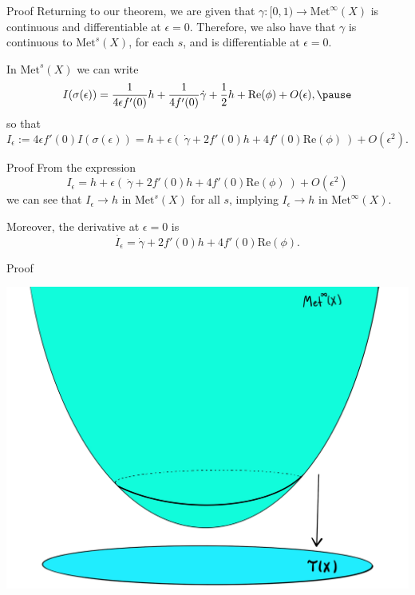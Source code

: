 \documentclass[professionalfont]{beamer}
\begin{document}
\begin{frame}{Proof}
Returning to our theorem, we are given that $\gamma:[0,1) \to \mathrm{Met}^\infty(X)$ is continuous and differentiable at $\epsilon = 0$. 
Therefore, we also have that $\gamma$ is continuous to $\mathrm{Met}^s(X)$, for each $s$, and is differentiable at $\epsilon = 0$. \pause
\newline

In $\mathrm{Met}^s(X)$ we can write 
\[
I(\sigma(\epsilon)) =  \frac{1}{4\epsilon f'(0)} h + \frac{1}{4 f'(0)} \dot{\gamma} + \frac{1}{2} h + \mathrm{Re}(\phi) + O(\epsilon), \pause
\]
so that 
\[
I_\epsilon := 4\epsilon f'(0)I(\sigma(\epsilon)) = h + \epsilon( \ \dot{\gamma} + 2 f'(0)h + 4 f'(0) \mathrm{Re}(\phi) \ ) + O(\epsilon^2).
\]

\end{frame}




\begin{frame}{Proof}
From the expression
\[
I_\epsilon = h + \epsilon( \ \dot{\gamma} + 2 f'(0)h + 4 f'(0) \mathrm{Re}(\phi) \ ) + O(\epsilon^2)
\]
we can see that $I_\epsilon \to h$ in $\mathrm{Met}^s(X)$ for all $s$, implying $I_\epsilon \to h$ in $\mathrm{Met}^\infty(X)$. 
\newline

Moreover, the derivative at $\epsilon = 0$ is 
\[
\dot{I_\epsilon}  = \dot{\gamma} + 2 f'(0) h + 4 f'(0) \mathrm{Re}(\phi).
\]

\end{frame}




\begin{frame}{Proof}

\centering\includegraphics[scale=0.09]{Teich-1.jpg}

\end{frame}
\end{document}
